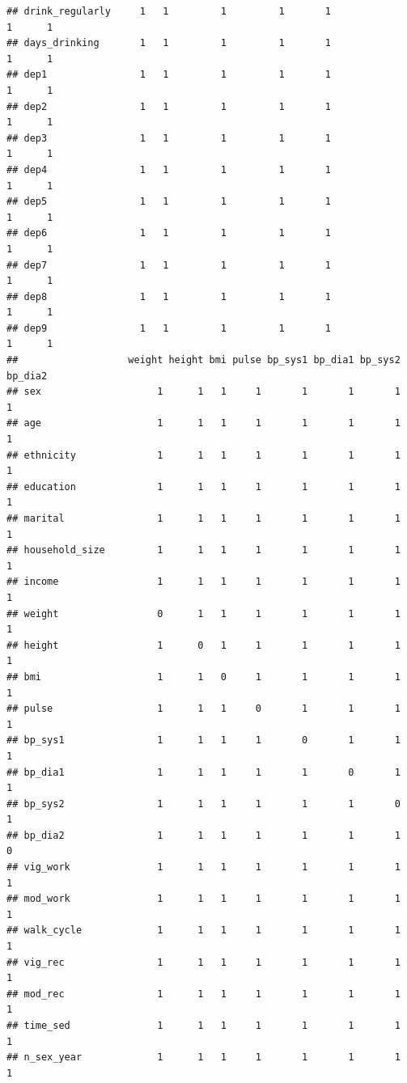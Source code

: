 \documentclass[
]{article}
\begin{document}
\begin{verbatim}
## drink_regularly     1   1         1         1       1              1      1
## days_drinking       1   1         1         1       1              1      1
## dep1                1   1         1         1       1              1      1
## dep2                1   1         1         1       1              1      1
## dep3                1   1         1         1       1              1      1
## dep4                1   1         1         1       1              1      1
## dep5                1   1         1         1       1              1      1
## dep6                1   1         1         1       1              1      1
## dep7                1   1         1         1       1              1      1
## dep8                1   1         1         1       1              1      1
## dep9                1   1         1         1       1              1      1
##                   weight height bmi pulse bp_sys1 bp_dia1 bp_sys2 bp_dia2
## sex                    1      1   1     1       1       1       1       1
## age                    1      1   1     1       1       1       1       1
## ethnicity              1      1   1     1       1       1       1       1
## education              1      1   1     1       1       1       1       1
## marital                1      1   1     1       1       1       1       1
## household_size         1      1   1     1       1       1       1       1
## income                 1      1   1     1       1       1       1       1
## weight                 0      1   1     1       1       1       1       1
## height                 1      0   1     1       1       1       1       1
## bmi                    1      1   0     1       1       1       1       1
## pulse                  1      1   1     0       1       1       1       1
## bp_sys1                1      1   1     1       0       1       1       1
## bp_dia1                1      1   1     1       1       0       1       1
## bp_sys2                1      1   1     1       1       1       0       1
## bp_dia2                1      1   1     1       1       1       1       0
## vig_work               1      1   1     1       1       1       1       1
## mod_work               1      1   1     1       1       1       1       1
## walk_cycle             1      1   1     1       1       1       1       1
## vig_rec                1      1   1     1       1       1       1       1
## mod_rec                1      1   1     1       1       1       1       1
## time_sed               1      1   1     1       1       1       1       1
## n_sex_year             1      1   1     1       1       1       1       1

\end{verbatim}
\end{document}
